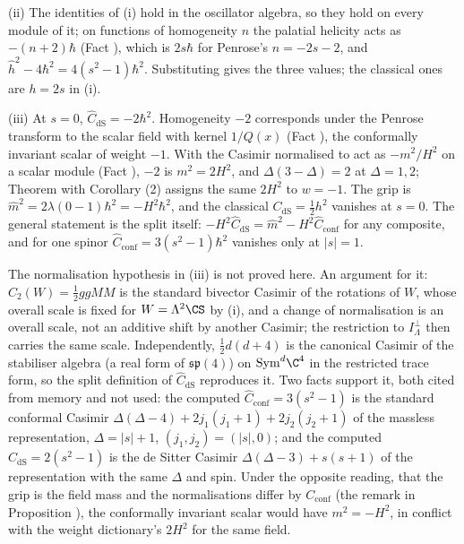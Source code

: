 (ii) The identities of (i) hold in the oscillator algebra, so they hold on every module of it; on functions of homogeneity $n$ the palatial helicity acts as $-(n + 2)\hbar$ (Fact ), which is $2s\hbar$ for Penrose's $n = -2s - 2$, and $\hat{h}^{2} - 4\hbar^{2} = 4(s^{2} - 1)\hbar^{2}$. Substituting gives the three values; the classical ones are $h = 2s$ in (i).

(iii) At $s = 0$, $\hat{C}_{\mathrm{dS}} = -2\hbar^{2}$. Homogeneity $-2$ corresponds under the Penrose transform to the scalar field with kernel $1/Q(x)$ (Fact ), the conformally invariant scalar of weight $-1$. With the Casimir normalised to act as $-m^{2}/H^{2}$ on a scalar module (Fact ), $-2$ is $m^{2} = 2H^{2}$, and $\Delta(3 - \Delta) = 2$ at $\Delta = 1, 2$; Theorem  with Corollary (2) assigns the same $2H^{2}$ to $w = -1$. The grip is $\hat{m}^{2} = 2\lambda(0 - 1)\hbar^{2} = -H^{2}\hbar^{2}$, and the classical $C_{\mathrm{dS}} = \tfrac12 h^{2}$ vanishes at $s = 0$. The general statement is the split itself: $-H^{2}\hat{C}_{\mathrm{dS}} = \hat{m}^{2} - H^{2}\hat{C}_{\mathrm{conf}}$ for any composite, and for one spinor $\hat{C}_{\mathrm{conf}} = 3(s^{2} - 1)\hbar^{2}$ vanishes only at $|s| = 1$.

The normalisation hypothesis in (iii) is not proved here. An argument for it: $C_{2}(W) = \tfrac12 g g M M$ is the standard bivector Casimir of the rotations of $W$, whose overall scale is fixed for $W = \Lambda^{2}\CS$ by (i), and a change of normalisation is an overall scale, not an additive shift by another Casimir; the restriction to $I_{\Lambda}^{\perp}$ then carries the same scale. Independently, $\tfrac12 d(d+4)$ is the canonical Casimir of the stabiliser algebra (a real form of $\mathfrak{sp}(4)$) on $\mathrm{Sym}^{d}\C^{4}$ in the restricted trace form, so the split definition of $\hat{C}_{\mathrm{dS}}$ reproduces it. Two facts support it, both cited from memory and not used: the computed $\hat{C}_{\mathrm{conf}} = 3(s^{2} - 1)$ is the standard conformal Casimir $\Delta(\Delta - 4) + 2j_{1}(j_{1} + 1) + 2j_{2}(j_{2} + 1)$ of the massless representation, $\Delta = |s| + 1$, $(j_{1}, j_{2}) = (|s|, 0)$; and the computed $\hat{C}_{\mathrm{dS}} = 2(s^{2} - 1)$ is the de Sitter Casimir $\Delta(\Delta - 3) + s(s + 1)$ of the representation with the same $\Delta$ and spin. Under the opposite reading, that the grip is the field mass and the normalisations differ by $C_{\mathrm{conf}}$ (the remark in Proposition ), the conformally invariant scalar would have $m^{2} = -H^{2}$, in conflict with the weight dictionary's $2H^{2}$ for the same field.
